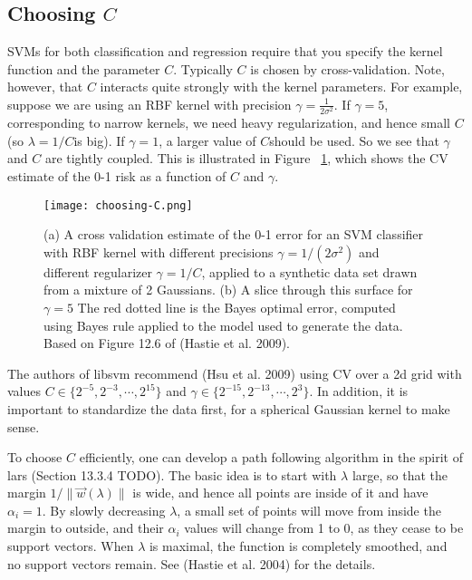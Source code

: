 \subsection{Choosing $C$}
\label{sec:SVM-Choosing-C}
SVMs for both classification and regression require that you specify the kernel function and the parameter $C$. Typically $C$ is chosen by cross-validation. Note, however, that $C$ interacts quite strongly with the kernel parameters. For example, suppose we are using an RBF kernel with precision $\gamma=\frac{1}{2\sigma^2}$. If $\gamma=5$, corresponding to narrow kernels, we need heavy regularization, and hence small $C$(so $\lambda=1/C$is big). If $\gamma=1$, a larger value of $C$should be used. So we see that $\gamma$ and $C$ are tightly coupled. This is illustrated in Figure ~\ref{fig:choosing-C}, which shows the CV estimate of the 0-1 risk as a function of $C$ and $\gamma$.

\begin{figure}[hbtp]
\centering
    \texttt{[image: choosing-C.png]}
\caption{(a) A cross validation estimate of the 0-1 error for an SVM classifier with RBF kernel with different precisions $\gamma=1/(2\sigma^2)$ and different regularizer $\gamma=1/C$, applied to a synthetic data set drawn from a mixture of 2 Gaussians. (b) A slice through this surface for $\gamma=5$ The red dotted line is the Bayes optimal error, computed using Bayes rule applied to the model used to generate the data. Based on Figure 12.6 of (Hastie et al. 2009). }
\label{fig:choosing-C} 
\end{figure}

The authors of libsvm recommend (Hsu et al. 2009) using CV over a 2d grid with values $C \in \{2^{−5},2^{−3},\cdots,2^{15}\}$ and $\gamma \in \{2^{−15},2^{−13},\cdots,2^3\}$. In addition, it is important to standardize the data first, for a spherical Gaussian kernel to make sense.

To choose $C$ efficiently, one can develop a path following algorithm in the spirit of lars (Section 13.3.4 TODO). The basic idea is to start with $\lambda$ large, so that the margin $1/\lVert\vec{w}(\lambda)\rVert$ is wide, and hence all points are inside of it and have $\alpha_i =1$. By slowly decreasing $\lambda$, a small set of points will move from inside the margin to outside, and their $\alpha_i$ values will change from 1 to 0, as they cease to be support vectors. When $\lambda$ is maximal, the function is completely smoothed, and no support vectors remain. See (Hastie et al. 2004) for the details.


